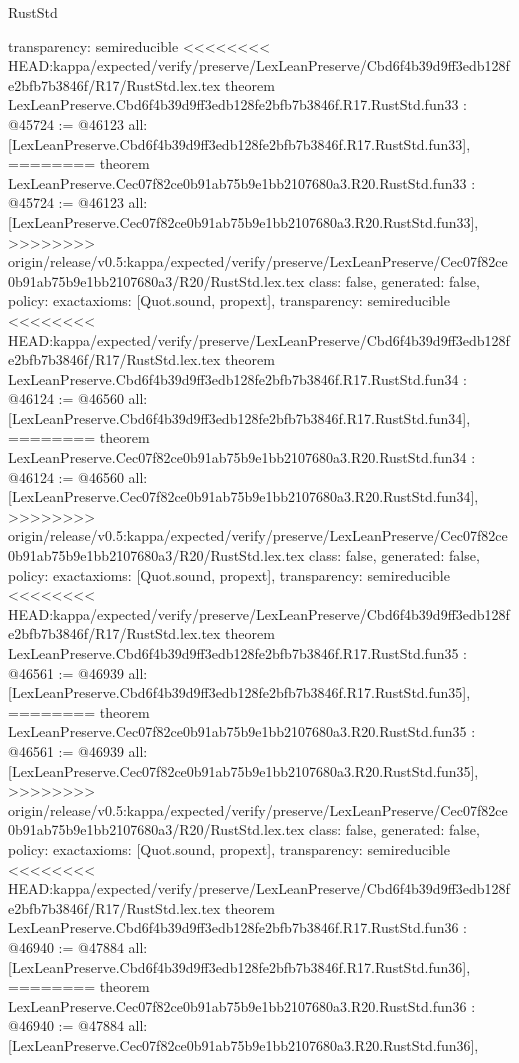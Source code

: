 \begin{lexlean}{RustStd}
\begin{coremodule}
{\begin{coremodule}
{{{{{{{{{{{{{{{{{{{{{{{{{{{{{{{{{{{{  transparency: semireducible
}
<<<<<<<< HEAD:kappa/expected/verify/preserve/LexLeanPreserve/Cbd6f4b39d9ff3edb128fe2bfb7b3846f/R17/RustStd.lex.tex
theorem LexLeanPreserve.Cbd6f4b39d9ff3edb128fe2bfb7b3846f.R17.RustStd.fun33 : @45724 := @46123 {
  all: [LexLeanPreserve.Cbd6f4b39d9ff3edb128fe2bfb7b3846f.R17.RustStd.fun33],
========
theorem LexLeanPreserve.Cec07f82ce0b91ab75b9e1bb2107680a3.R20.RustStd.fun33 : @45724 := @46123 {
  all: [LexLeanPreserve.Cec07f82ce0b91ab75b9e1bb2107680a3.R20.RustStd.fun33],
>>>>>>>> origin/release/v0.5:kappa/expected/verify/preserve/LexLeanPreserve/Cec07f82ce0b91ab75b9e1bb2107680a3/R20/RustStd.lex.tex
  class: false,
  generated: false,
  policy: exact{axioms: [Quot.sound, propext]},
  transparency: semireducible
}
<<<<<<<< HEAD:kappa/expected/verify/preserve/LexLeanPreserve/Cbd6f4b39d9ff3edb128fe2bfb7b3846f/R17/RustStd.lex.tex
theorem LexLeanPreserve.Cbd6f4b39d9ff3edb128fe2bfb7b3846f.R17.RustStd.fun34 : @46124 := @46560 {
  all: [LexLeanPreserve.Cbd6f4b39d9ff3edb128fe2bfb7b3846f.R17.RustStd.fun34],
========
theorem LexLeanPreserve.Cec07f82ce0b91ab75b9e1bb2107680a3.R20.RustStd.fun34 : @46124 := @46560 {
  all: [LexLeanPreserve.Cec07f82ce0b91ab75b9e1bb2107680a3.R20.RustStd.fun34],
>>>>>>>> origin/release/v0.5:kappa/expected/verify/preserve/LexLeanPreserve/Cec07f82ce0b91ab75b9e1bb2107680a3/R20/RustStd.lex.tex
  class: false,
  generated: false,
  policy: exact{axioms: [Quot.sound, propext]},
  transparency: semireducible
}
<<<<<<<< HEAD:kappa/expected/verify/preserve/LexLeanPreserve/Cbd6f4b39d9ff3edb128fe2bfb7b3846f/R17/RustStd.lex.tex
theorem LexLeanPreserve.Cbd6f4b39d9ff3edb128fe2bfb7b3846f.R17.RustStd.fun35 : @46561 := @46939 {
  all: [LexLeanPreserve.Cbd6f4b39d9ff3edb128fe2bfb7b3846f.R17.RustStd.fun35],
========
theorem LexLeanPreserve.Cec07f82ce0b91ab75b9e1bb2107680a3.R20.RustStd.fun35 : @46561 := @46939 {
  all: [LexLeanPreserve.Cec07f82ce0b91ab75b9e1bb2107680a3.R20.RustStd.fun35],
>>>>>>>> origin/release/v0.5:kappa/expected/verify/preserve/LexLeanPreserve/Cec07f82ce0b91ab75b9e1bb2107680a3/R20/RustStd.lex.tex
  class: false,
  generated: false,
  policy: exact{axioms: [Quot.sound, propext]},
  transparency: semireducible
}
<<<<<<<< HEAD:kappa/expected/verify/preserve/LexLeanPreserve/Cbd6f4b39d9ff3edb128fe2bfb7b3846f/R17/RustStd.lex.tex
theorem LexLeanPreserve.Cbd6f4b39d9ff3edb128fe2bfb7b3846f.R17.RustStd.fun36 : @46940 := @47884 {
  all: [LexLeanPreserve.Cbd6f4b39d9ff3edb128fe2bfb7b3846f.R17.RustStd.fun36],
========
theorem LexLeanPreserve.Cec07f82ce0b91ab75b9e1bb2107680a3.R20.RustStd.fun36 : @46940 := @47884 {
  all: [LexLeanPreserve.Cec07f82ce0b91ab75b9e1bb2107680a3.R20.RustStd.fun36],
}}}}}}}}}}}}}}}}}}}}}}}}}}}}}}}}}}}}}}}}
\end{coremodule}}
\end{coremodule}
\end{lexlean}
